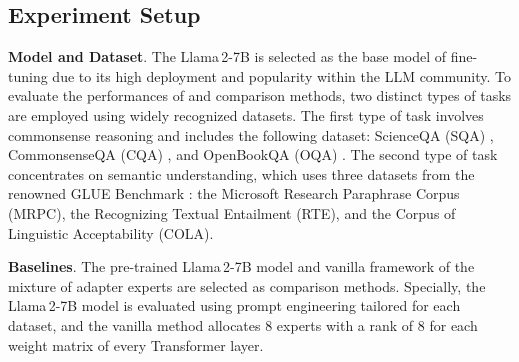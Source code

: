 \subsection{Experiment Setup}
\textbf{Model and Dataset}. 
The Llama\,2-7B \cite{touvron2023llama} is selected as the base model of fine-tuning due to its high deployment and popularity within the LLM community. To evaluate the performances of \name and comparison methods, two distinct types of tasks are employed using widely recognized datasets. The first type of task involves commonsense reasoning and includes the following dataset: ScienceQA (SQA) \cite{lu2022learn}, CommonsenseQA (CQA) \cite{talmor2019commonsenseqa}, and OpenBookQA (OQA) \cite{mihaylov2018can}. The second type of task concentrates on semantic understanding, which uses three datasets from the renowned GLUE Benchmark \cite{wang2019glue}: the Microsoft Research Paraphrase Corpus (MRPC), the Recognizing Textual Entailment (RTE), and the Corpus of Linguistic Acceptability (COLA).

\textbf{Baselines}. 
The pre-trained Llama\,2-7B model and vanilla framework of the mixture of adapter experts are selected as comparison methods. Specially, the Llama\,2-7B model is evaluated using prompt engineering tailored for each dataset, and the vanilla method allocates 8 experts with a rank of 8 for each weight matrix of every Transformer layer. 

